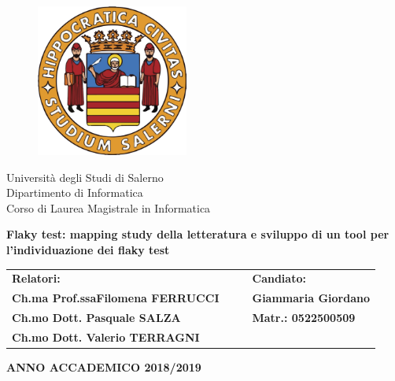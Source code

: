\documentclass[14pt]{extreport}
\begin{document}
\begin{titlepage}
\begin{center}
	\begin{figure}
    	\includegraphics[width=5cm, height=5cm]{unisa.png}
    	\centering
    \end{figure}
	{\Large Università degli Studi di Salerno}\\[0.2truecm]
	{\large Dipartimento di Informatica\\Corso di Laurea Magistrale in Informatica}\\
	\hrulefill
	\vfill

	\vfill\vfill
	{\LARGE {\bf Flaky test: mapping study della letteratura e sviluppo di un tool per l’individuazione dei flaky test}}

	\vfill\vfill
	\begin{table}[h!]
		\begin{tabular}{llll}
			\textbf{Relatori:}                       & \textbf{} & \textbf{} & \textbf{Candiato:}          \\
			\textbf{Ch.ma Prof.ssaFilomena FERRUCCI} & \textbf{} & \textbf{} & \textbf{Giammaria Giordano} \\
			\textbf{Ch.mo Dott. Pasquale SALZA}      & \textbf{} & \textbf{} & \textbf{Matr.: 0522500509}  \\
			\textbf{Ch.mo Dott. Valerio TERRAGNI}    & \textbf{} & \textbf{} & \textbf{}                  
		\end{tabular}
	\end{table}
	
	
	\vfill
	\hrulefill 
	\begin{center} \textbf{ANNO ACCADEMICO 2018/2019}\end{center}
	
\end{center}
\end{titlepage}

\setcounter{page}{1} 		
\end{document}
